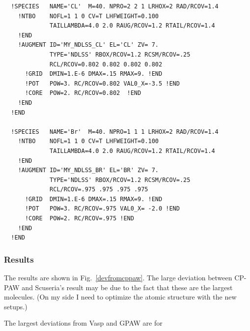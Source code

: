 \documentclass[11pt,a4paper]{report}
\begin{document}
\begin{verbatim}
  !SPECIES   NAME='CL'  M=40. NPRO=2 2 1 LRHOX=2 RAD/RCOV=1.4
    !NTBO    NOFL=1 1 0 CV=T LHFWEIGHT=0.100
             TAILLAMBDA=4.0 2.0 RAUG/RCOV=1.2 RTAIL/RCOV=1.4 
    !END 
    !AUGMENT ID='MY_NDLSS_CL' EL='CL' ZV= 7.
             TYPE='NDLSS' RBOX/RCOV=1.2 RCSM/RCOV=.25
             RCL/RCOV=0.802 0.802 0.802 0.802 
      !GRID  DMIN=1.E-6 DMAX=.15 RMAX=9. !END
      !POT   POW=3. RC/RCOV=0.802 VAL0_X=-3.5 !END
      !CORE  POW=2. RC/RCOV=0.802  !END
    !END
  !END

  !SPECIES   NAME='Br'  M=40. NPRO=1 1 1 LRHOX=2 RAD/RCOV=1.4
    !NTBO    NOFL=1 1 0 CV=T LHFWEIGHT=0.100
             TAILLAMBDA=4.0 2.0 RAUG/RCOV=1.2 RTAIL/RCOV=1.4 
    !END 
    !AUGMENT ID='MY_NDLSS_BR' EL='BR' ZV= 7.
             TYPE='NDLSS' RBOX/RCOV=1.2 RCSM/RCOV=.25
             RCL/RCOV=.975 .975 .975 .975
      !GRID  DMIN=1.E-6 DMAX=.15 RMAX=9. !END
      !POT   POW=3. RC/RCOV=.975 VAL0_X= -2.0 !END
      !CORE  POW=2. RC/RCOV=.975 !END
    !END
  !END
\end{verbatim}

\subsubsection{Results}
The results are shown in Fig.~\ref{devfromcppaw}. The large deviation
between CP-PAW and Scuseria's result may be due to the fact that these
are the largest molecules. (On my side I need to optimize the atomic
structure with the new setups.)

The largest deviations from Vasp and GPAW are for
\end{document}
